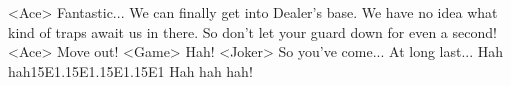 <Ace> Fantastic... 
We can finally get into Dealer's base. 
We have no idea what kind of traps await us in there. 
So don't let your guard down for even a second! 
<Ace> Move out! 
<Game> Hah! 
<Joker> So you've come... 
At long last... 
Hah hah{15}{E1}.{15}{E1}.{15}{E1}.{15}{E1} Hah hah hah! 
